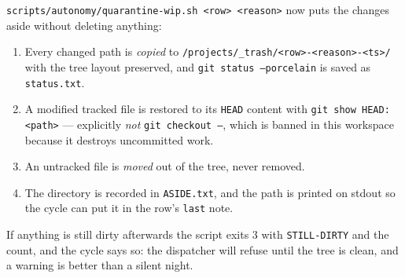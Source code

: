 \texttt{scripts/autonomy/quarantine-wip.sh <row> <reason>} now puts the changes aside without
deleting anything:

\begin{enumerate}
	\item Every changed path is \emph{copied} to
	\texttt{/projects/\_trash/<row>-<reason>-<ts>/} with the tree layout preserved, and
	\texttt{git status --porcelain} is saved as \texttt{status.txt}.
	\item A modified tracked file is restored to its \texttt{HEAD} content with \texttt{git
	show HEAD:<path>} --- explicitly \emph{not} \texttt{git checkout --}, which is banned in
	this workspace because it destroys uncommitted work.
	\item An untracked file is \emph{moved} out of the tree, never removed.
	\item The directory is recorded in \texttt{ASIDE.txt}, and the path is printed on stdout so
	the cycle can put it in the row's \texttt{last} note.
\end{enumerate}

If anything is still dirty afterwards the script exits 3 with \texttt{STILL-DIRTY} and the
count, and the cycle says so: the dispatcher will refuse until the tree is clean, and a
warning is better than a silent night.

\begin{center}
\end{center}

